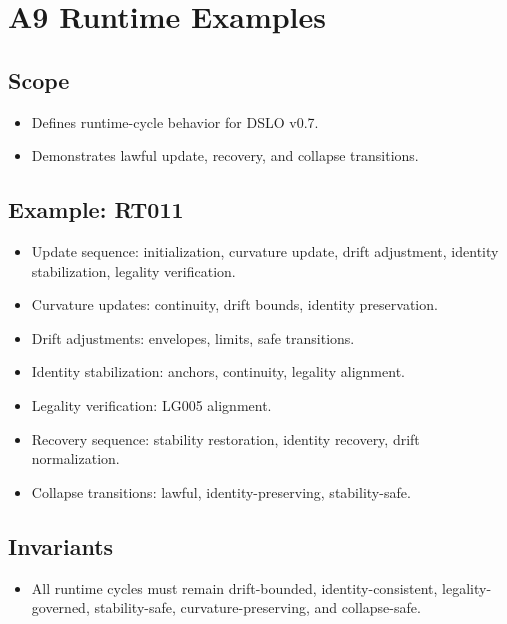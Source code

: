 \section{A9 Runtime Examples}

\subsection{Scope}
\begin{itemize}
    \item Defines runtime-cycle behavior for DSLO v0.7.
    \item Demonstrates lawful update, recovery, and collapse transitions.
\end{itemize}

\subsection{Example: RT011}
\begin{itemize}
    \item Update sequence: initialization, curvature update, drift adjustment, identity stabilization, legality verification.
    \item Curvature updates: continuity, drift bounds, identity preservation.
    \item Drift adjustments: envelopes, limits, safe transitions.
    \item Identity stabilization: anchors, continuity, legality alignment.
    \item Legality verification: LG005 alignment.
    \item Recovery sequence: stability restoration, identity recovery, drift normalization.
    \item Collapse transitions: lawful, identity-preserving, stability-safe.
\end{itemize}

\subsection{Invariants}
\begin{itemize}
    \item All runtime cycles must remain drift-bounded, identity-consistent, legality-governed, stability-safe, curvature-preserving, and collapse-safe.
\end{itemize}
